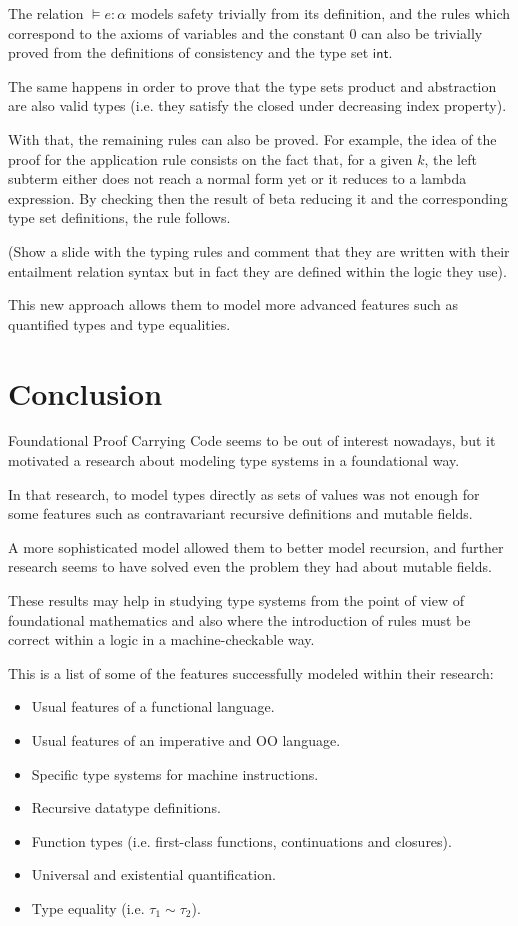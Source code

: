 \documentclass{article}
\begin{document}
The relation $\models e : \alpha$ models safety trivially from 
its definition, and the rules which correspond to the axioms 
of variables and the constant $0$ can also be trivially proved 
from the definitions of consistency and the type set 
$\mathsf{int}$.

The same happens in order to prove that the type sets product 
and abstraction are also valid types (i.e. they satisfy the 
closed under decreasing index property).

With that, the remaining rules can also be proved. For example,
the idea of the proof for the application rule consists on 
the fact that, for a given $k$, the left subterm either does not 
reach a normal form yet or it reduces to a lambda expression. By 
checking then the result of beta reducing it and the corresponding 
type set definitions, the rule follows.

(Show a slide with the typing rules and comment that they are 
written with their entailment relation syntax but in fact 
they are defined within the logic they use).

This new approach allows them to model more advanced features 
such as quantified types and type equalities.

\section*{Conclusion}

Foundational Proof Carrying Code seems to be out of interest 
nowadays, but it motivated a research about modeling type systems 
in a foundational way.

In that research, to model types directly as sets of values was
not enough for some features such as contravariant recursive
definitions and mutable fields.

A more sophisticated model allowed them to better model recursion, 
and further research seems to have solved even the problem they 
had about mutable fields.

These results may help in studying type systems from the point of 
view of foundational mathematics and also where the introduction 
of rules must be correct within a logic in a machine-checkable 
way.

This is a list of some of the features successfully modeled within 
their research:

\begin{itemize}
  \item Usual features of a functional language.
  \item Usual features of an imperative and OO language.
  \item Specific type systems for machine instructions.
  \item Recursive datatype definitions.
  \item Function types (i.e. first-class functions, continuations 
    and closures).
  \item Universal and existential quantification.
  \item Type equality (i.e. $\tau_1 \sim \tau_2$).
\end{itemize}


{}

\end{document}
